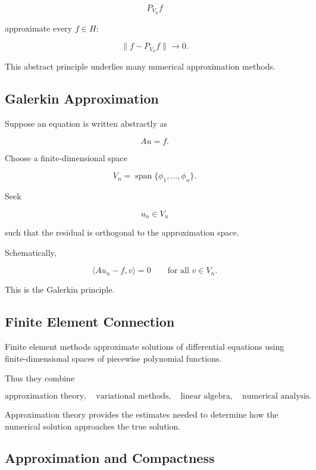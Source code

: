 \[
P_{V_n}f
\]

approximate every \(f\in H\):

\[
\boxed{
\|f-P_{V_n}f\|\to0.
}
\]

This abstract principle underlies many numerical approximation methods.

\subsection{Galerkin Approximation}
\label{subsec:galerkin-approximation}

Suppose an equation is written abstractly as

\[
Au=f.
\]

Choose a finite-dimensional space

\[
V_n
=
\operatorname{span}
\{
\phi_1,\ldots,\phi_n
\}.
\]

Seek

\[
u_n\in V_n
\]

such that the residual is orthogonal to the approximation space.

Schematically,

\[
\boxed{
\langle Au_n-f,v\rangle=0
\qquad
\text{for all }v\in V_n.
}
\]

This is the Galerkin principle.

\subsection{Finite Element Connection}
\label{subsec:finite-element-connection}

Finite element methods approximate solutions of differential equations
using finite-dimensional spaces of piecewise polynomial functions.

Thus they combine

\[
\boxed{
\text{approximation theory},
\quad
\text{variational methods},
\quad
\text{linear algebra},
\quad
\text{numerical analysis}.
}
\]

Approximation theory provides the estimates needed to determine how the
numerical solution approaches the true solution.

\subsection{Approximation and Compactness}
\label{subsec:approximation-compactness}

